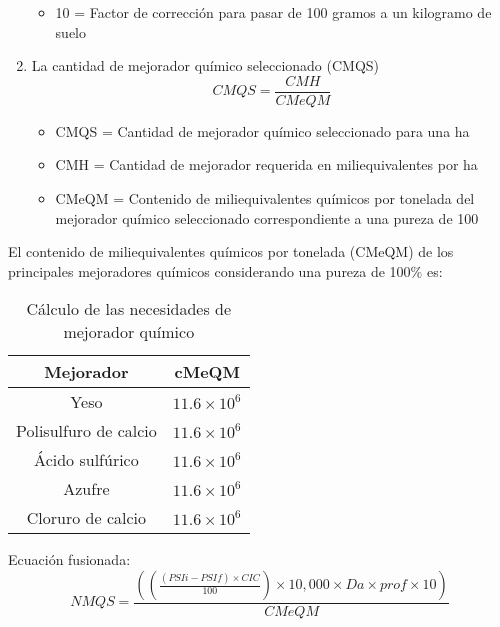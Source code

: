 \begin{enumerate}
\begin{notation}
\begin{itemize}
            \item 10 = Factor de corrección para pasar de 100 gramos a un kilogramo de suelo
        \end{itemize}
    \end{notation}
    \item La cantidad de mejorador químico seleccionado (CMQS)
    \begin{equation}
        CMQS = \frac{CMH}{CMeQM}
    \end{equation}
    \begin{notation}
        \begin{itemize}
            \item CMQS = Cantidad de mejorador químico seleccionado para una ha
            \item CMH = Cantidad de mejorador requerida en miliequivalentes por ha
            \item CMeQM = Contenido de miliequivalentes químicos por tonelada del mejorador químico seleccionado correspondiente a una pureza de 100%
        \end{itemize}
    \end{notation}
\end{enumerate}
El contenido de miliequivalentes químicos por tonelada (CMeQM) de los principales mejoradores químicos considerando una pureza de 100\% es:
\begin{table}[h!]
    \centering
    \begin{tabular}{@{}cc@{}}
    \toprule
    Mejorador             & cMeQM             \\ \midrule
    Yeso                  & $11.6\times 10^6$ \\
    Polisulfuro de calcio & $11.6\times 10^6$ \\
    Ácido sulfúrico       & $11.6\times 10^6$ \\
    Azufre                & $11.6\times 10^6$ \\
    Cloruro de calcio     & $11.6\times 10^6$ \\ \bottomrule
    \end{tabular}
    \caption{Cálculo de las necesidades de mejorador químico}
    \label{tabsa41}
\end{table}
Ecuación fusionada:
\begin{equation}
    NMQS = \frac{(\left(\frac{(PSIi - PSIf) \times  CIC}{100}\right) \times  10,000 \times  Da \times  prof \times  10)}{CMeQM} 
\end{equation}
